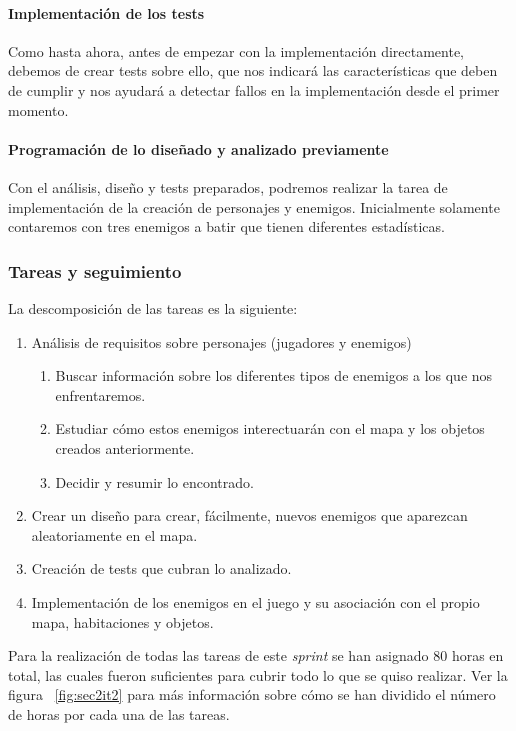 \paragraph{Implementación de los tests} Como hasta ahora, antes de empezar con la implementación directamente, debemos de crear tests sobre ello, que nos indicará las características que deben de cumplir y nos ayudará a detectar fallos en la implementación desde el primer momento.

\paragraph{Programación de lo diseñado y analizado previamente} Con el análisis, diseño y tests preparados, podremos realizar la tarea de implementación de la creación de personajes y enemigos. Inicialmente solamente contaremos con tres enemigos a batir que tienen diferentes estadísticas.

\subsubsection{Tareas y seguimiento}

La descomposición de las tareas es la siguiente:

\begin{enumerate}[label=\bfseries WBS 2.\arabic*]
  \item Análisis de requisitos sobre personajes (jugadores y enemigos)
    \begin{enumerate}[label=\bfseries WBS 2.1.\arabic*]
      \item Buscar información sobre los diferentes tipos de enemigos a los que nos enfrentaremos.
      \item Estudiar cómo estos enemigos interectuarán con el mapa y los objetos creados anteriormente.
      \item Decidir y resumir lo encontrado.
    \end{enumerate}
  \item Crear un diseño para crear, fácilmente, nuevos enemigos que aparezcan aleatoriamente en el mapa.
  \item Creación de tests que cubran lo analizado.
  \item Implementación de los enemigos en el juego y su asociación con el propio mapa, habitaciones y objetos.
\end{enumerate}

Para la realización de todas las tareas de este \textit{sprint} se han asignado 80 horas en total, las cuales fueron suficientes para cubrir todo lo que se quiso realizar. Ver la figura ~\ref{fig:sec2it2} para más información sobre cómo se han dividido el número de horas por cada una de las tareas.

